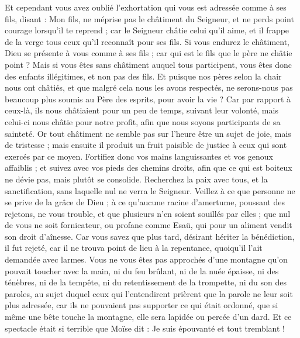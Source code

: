 \begin{multicols}{2}
Et cependant vous avez oublié l'exhortation qui vous est adressée comme à ses fils, disant : Mon fils, ne méprise pas le châtiment du Seigneur, et ne perds point courage lorsqu'il te reprend ;
car le Seigneur châtie celui qu'il aime, et il frappe de la verge tous ceux qu'il reconnaît pour ses fils.
Si vous endurez le châtiment, Dieu se présente à vous comme à ses fils ; car qui est le fils que le père ne châtie point ?
Mais si vous êtes sans châtiment auquel tous participent, vous êtes donc des enfants illégitimes, et non pas des fils.
Et puisque nos pères selon la chair nous ont châtiés, et que malgré cela nous les avons respectés, ne serons-nous pas beaucoup plus soumis au Père des esprits, pour avoir la vie ?
Car par rapport à ceux-là, ils nous châtiaient pour un peu de temps, suivant leur volonté, mais celui-ci nous châtie pour notre profit, afin que nous soyons participants de sa sainteté.
Or tout châtiment ne semble pas sur l'heure être un sujet de joie, mais de tristesse ; mais ensuite il produit un fruit paisible de justice à ceux qui sont exercés par ce moyen.
Fortifiez donc vos mains languissantes et vos genoux affaiblis ;
et suivez avec vos pieds des chemins droits, afin que ce qui est boiteux ne dévie pas, mais plutôt se consolide.
Recherchez la paix avec tous, et la sanctification, sans laquelle nul ne verra le Seigneur.
Veillez à ce que personne ne se prive de la grâce de Dieu ; à ce qu'aucune racine d'amertume, poussant des rejetons, ne vous trouble, et que plusieurs n'en soient souillés par elles ;
que nul de vous ne soit fornicateur, ou profane comme Esaü, qui pour un aliment vendit son droit d'aînesse.
Car vous savez que plus tard, désirant hériter la bénédiction, il fut rejeté, car il ne trouva point de lieu à la repentance, quoiqu'il l'ait demandée avec larmes.
Vous ne vous êtes pas approchés d'une montagne qu'on pouvait toucher avec la main, ni du feu brûlant, ni de la nuée épaisse, ni des ténèbres, ni de la tempête,
ni du retentissement de la trompette, ni du son des paroles, au sujet duquel ceux qui l'entendirent prièrent que la parole ne leur soit plus adressée,
car ils ne pouvaient pas supporter ce qui était ordonné, que si même une bête touche la montagne, elle sera lapidée ou percée d'un dard.
Et ce spectacle était si terrible que Moïse dit : Je suis épouvanté et tout tremblant !

\end{multicols}
